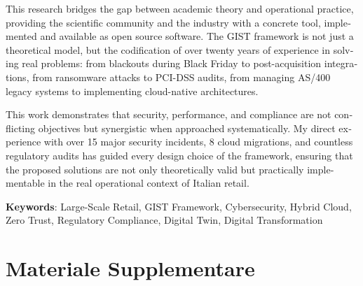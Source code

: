 \documentclass[12pt,a4paper,oneside]{book}
\begin{document}
\begin{otherlanguage}{english}
This research bridges the gap between academic theory and operational practice, providing the scientific community and the industry with a concrete tool, implemented and available as open source software. The GIST framework is not just a theoretical model, but the codification of over twenty years of experience in solving real problems: from blackouts during Black Friday to post-acquisition integrations, from ransomware attacks to PCI-DSS audits, from managing AS/400 legacy systems to implementing cloud-native architectures.

This work demonstrates that security, performance, and compliance are not conflicting objectives but synergistic when approached systematically. My direct experience with over 15 major security incidents, 8 cloud migrations, and countless regulatory audits has guided every design choice of the framework, ensuring that the proposed solutions are not only theoretically valid but practically implementable in the real operational context of Italian retail.

\textbf{Keywords}: Large-Scale Retail, GIST Framework, Cybersecurity, Hybrid Cloud, Zero Trust, Regulatory Compliance, Digital Twin, Digital Transformation


\end{otherlanguage}

\clearpage



%




%
% 

%

%

\chapter*{Materiale Supplementare}


\appendix




\backmatter


\printbibliography[
    heading=bibintoc,
    title={Bibliografia Generale}
]
\end{document}
